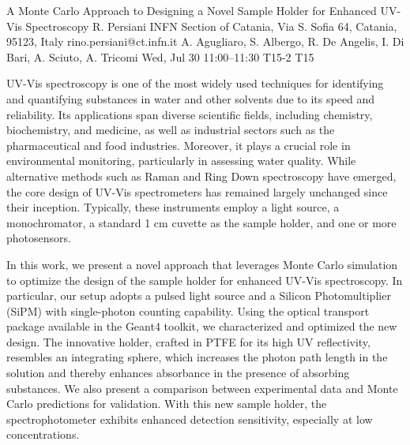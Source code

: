 \documentclass[12pt,lettersize,oneside]{book} %
\begin{document}
\begin{talk}
  {A Monte Carlo Approach to Designing a Novel Sample Holder for Enhanced UV-Vis Spectroscopy}%
  {R. Persiani}%
  {INFN Section of Catania, Via S. Sofia 64, Catania, 95123, Italy}%
  {rino.persiani@ct.infn.it}%
  {A. Agugliaro, S. Albergo, R. De Angelis, I. Di Bari, A. Sciuto, A. Tricomi}%
  {}%
  {Wed, Jul 30 11:00--11:30}%
  {T15-2}%
  {T15}%
  
    
   
UV-Vis spectroscopy is one of the most widely used techniques for identifying and quantifying substances in water and other solvents due to its speed and reliability. Its applications span diverse scientific fields, including chemistry, biochemistry, and medicine, as well as industrial sectors such as the pharmaceutical and food industries. Moreover, it plays a crucial role in environmental monitoring, particularly in assessing water quality. While alternative methods such as Raman and Ring Down spectroscopy have emerged, the core design of UV-Vis spectrometers has remained largely unchanged since their inception. Typically, these instruments employ a light source, a monochromator, a standard 1 cm cuvette as the sample holder, and one or more photosensors.

In this work, we present a novel approach that leverages Monte Carlo simulation to optimize the design of the sample holder for enhanced UV-Vis spectroscopy. In particular, our setup adopts a pulsed light source and a Silicon Photomultiplier (SiPM) with single-photon counting capability. Using the optical transport package available in the Geant4 toolkit, we characterized and optimized the new design. The innovative holder, crafted in PTFE for its high UV reflectivity, resembles an integrating sphere, which increases the photon path length in the solution and thereby enhances absorbance in the presence of absorbing substances. We also present a comparison between experimental data and Monte Carlo predictions for validation. With this new sample holder, the spectrophotometer exhibits enhanced detection sensitivity, especially at low concentrations.

\medskip

\end{talk}
\end{document}
